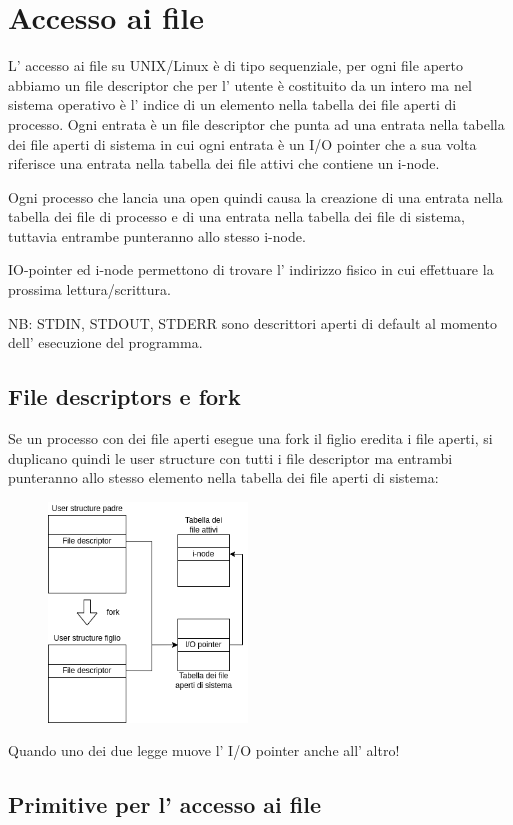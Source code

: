 \section{Accesso ai file}
L' accesso ai file su UNIX/Linux è di tipo sequenziale, per ogni file aperto abbiamo un file descriptor che per l' utente è costituito da un intero ma nel sistema operativo è l' indice di un elemento nella tabella dei file aperti di processo.
Ogni entrata è un file descriptor che punta ad una entrata nella tabella dei file aperti di sistema in cui ogni entrata è un I/O pointer che a sua volta riferisce una entrata nella tabella dei file attivi che contiene un i-node.

Ogni processo che lancia una open quindi causa la creazione di una entrata nella tabella dei file di processo e di una entrata nella tabella dei file di sistema, tuttavia entrambe punteranno allo stesso i-node.

IO-pointer ed i-node permettono di trovare l' indirizzo fisico in cui effettuare la prossima lettura/scrittura.

NB: STDIN, STDOUT, STDERR sono descrittori aperti di default al momento dell' esecuzione del programma.

\subsection{File descriptors e fork}
Se un processo con dei file aperti esegue una fork il figlio eredita i file aperti, si duplicano quindi le user structure con tutti i file descriptor ma entrambi punteranno allo stesso elemento nella tabella dei file aperti di sistema:
\begin{figure}[H]
    \centering
    \includegraphics[width=200px]{images/5L_Accesso_ai_file/file_descritor_and_fork.png}
\end{figure}
Quando uno dei due legge muove l' I/O pointer anche all' altro!

\subsection{Primitive per l' accesso ai file}
